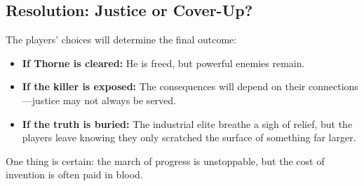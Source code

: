 \subsection{Resolution: Justice or Cover-Up?}  
The players’ choices will determine the final outcome:

\begin{itemize}
    \item \textbf{If Thorne is cleared:} He is freed, but powerful enemies remain.
    \item \textbf{If the killer is exposed:} The consequences will depend on their connections—justice may not always be served.
    \item \textbf{If the truth is buried:} The industrial elite breathe a sigh of relief, but the players leave knowing they only scratched the surface of something far larger.
\end{itemize}

One thing is certain: the march of progress is unstoppable, but the cost of invention is often paid in blood.
